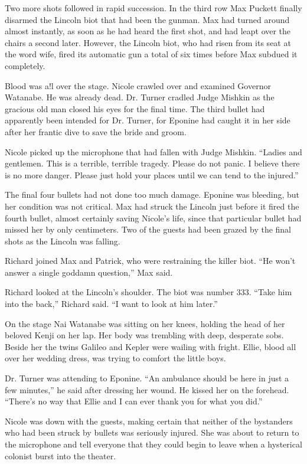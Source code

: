 \documentclass[]{article}
\begin{document}
{Two more shots followed in rapid succession. In the third row Max Puckett finally disarmed the Lincoln biot that had been the gunman. Max had turned around almost instantly, as soon as he had heard the first shot, and had leapt over the chairs a second later. However, the Lincoln biot, who had risen from its seat at the word wife, fired its automatic gun a total of six times before Max subdued it completely.

Blood was a!l over the stage. Nicole crawled over and examined Governor Watanabe. He was already dead. Dr. Turner cradled Judge Mishkin as the gracious old man closed his eyes for the final time. The third bullet had apparently been intended for Dr. Turner, for Eponine had caught it in her side after her frantic dive to save the bride and groom.

Nicole picked up the microphone that had fallen with Judge Mishkin. “Ladies and gentlemen. This is a terrible, terrible tragedy. Please do not panic. I believe there is no more danger. Please just hold your places until we can tend to the injured.”

The final four bullets had not done too much damage. Eponine was bleeding, but her condition was not critical. Max had struck the Lincoln just before it fired the fourth bullet, almost certainly saving Nicole’s life, since that particular bullet had missed her by only centimeters. Two of the guests had been grazed by the final shots as the Lincoln was falling.

Richard joined Max and Patrick, who were restraining the killer biot. “He won’t answer a single goddamn question,” Max said.

Richard looked at the Lincoln’s shoulder. The biot was number 333. “Take him into the back,” Richard said. “I want to look at him later.”

On the stage Nai Watanabe was sitting on her knees, holding the head of her beloved Kenji on her lap. Her body was trembling with deep, desperate sobs. Beside her the twins Galileo and Kepler were wailing with fright. Ellie, blood all over her wedding dress, was trying to comfort the little boys.

Dr. Turner was attending to Eponine. “An ambulance should be here in just a few minutes,” he said after dressing her wound. He kissed her on the forehead. “There’s no way that Ellie and I can ever thank you for what you did.”

Nicole was down with the guests, making certain that neither of the bystanders who had been struck by bullets was seriously injured. She was about to return to the microphone and tell everyone that they could begin to leave when a hysterical colonist burst into the theater.

}
\end{document}
